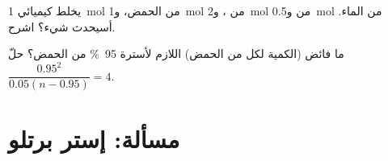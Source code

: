 \begin{exercise}[$\star\star\star$]\label{exo:g12:equilibrium:14}
يخلط كيميائي \qty{1}{mol} من الحمض، و\qty{1}{mol} من ،
و\qty{2}{mol} من  و\qty{0.5}{mol} من الماء. أسيحدث شيء؟
اشرح.
\end{exercise}

\begin{exercise}[$\star\star\star$]\label{exo:g12:equilibrium:15}
ما فائض  (الكمية لكل  من الحمض) اللازم لأسترة
\qty{95}{\percent} من الحمض؟ حلّ $\dfrac{0.95^2}{0.05(n - 0.95)} =
4$.
\end{exercise}

\section{مسألة: إستر برتلو}

